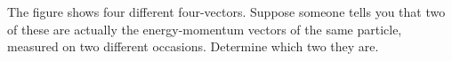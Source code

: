 The figure shows four different four-vectors.
Suppose someone tells you that two of these are actually the energy-momentum
vectors of the same particle, measured on two different occasions.
Determine which two they are.
